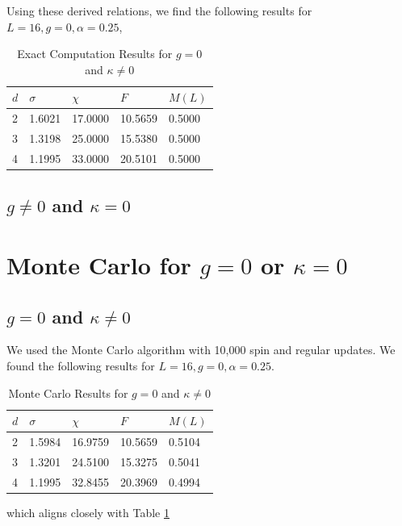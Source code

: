 \documentclass[12]{report}
\newcommand\0{\mathbf{0}}
\newcommand\<{\langle}
\renewcommand\>{\rangle}
\begin{document}
Using these derived relations, we find the following results for $L = 16, g = 0, \alpha = 0.25$,

\begin{table}[H]
\label{table:exact-kappa}
\centering
\begin{tabular}{|l|l|l|l|l|}
\hline
$d$ & $\sigma$          & $\chi$             & $F$                & $M(L)$ \\ \hline
2   & 1.6021 & 17.0000 & 10.5659 & 0.5000    \\
3   & 1.3198 & 25.0000  & 15.5380 &   0.5000  \\
4   & 1.1995  &  33.0000  & 20.5101  &    0.5000 \\ \hline
\end{tabular}
\caption{Exact Computation Results for $g=0$ and $\kappa \neq 0$}
\end{table}

\subsection{$g\neq 0$ and $\kappa = 0$}

\section{Monte Carlo for $g=0$ or $\kappa = 0$}

\subsection{$g=0$ and $\kappa \neq 0$}

We used the Monte Carlo algorithm with 10,000 spin and regular updates. We found the following results for $L = 16, g = 0, \alpha = 0.25$.

\begin{table}[H]
\centering
\begin{tabular}{|l|l|l|l|l|}
\hline
$d$ & $\sigma$ & $\chi$ & $F$ & $M(L)$ \\ \hline
2   & 1.5984 & 16.9759 & 10.5659 & 0.5104 \\
3   & 1.3201 & 24.5100 & 15.3275 & 0.5041 \\
4   & 1.1995  &  32.8455 & 20.3969  & 0.4994 \\ \hline
\end{tabular}
\caption{Monte Carlo Results for $g=0$ and $\kappa \neq 0$}
\end{table}

which aligns closely with Table \ref{table:exact-kappa}
\end{document}
